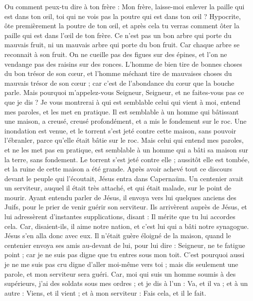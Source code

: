 \begin{multicols}{2}
Ou comment peux-tu dire à ton frère : Mon frère, laisse-moi enlever la paille qui est dans ton œil, toi qui ne vois pas la poutre qui est dans ton œil ? Hypocrite, ôte premièrement la poutre de ton œil, et après cela tu verras comment ôter la paille qui est dans l’œil de ton frère.
Ce n’est pas un bon arbre qui porte du mauvais fruit, ni un mauvais arbre qui porte du bon fruit.
Car chaque arbre se reconnait à son fruit. On ne cueille pas des figues sur des épines, et l’on ne vendange pas des raisins sur des ronces.
L'homme de bien tire de bonnes choses du bon trésor de son cœur, et l'homme méchant tire de mauvaises choses du mauvais trésor de son cœur ; car c'est de l'abondance du cœur que la bouche parle.
Mais pourquoi m'appelez-vous Seigneur, Seigneur, et ne faites-vous pas ce que je dis ?
Je vous montrerai à qui est semblable celui qui vient à moi, entend mes paroles, et les met en pratique.
Il est semblable à un homme qui bâtissant une maison, a creusé, creusé profondément, et a mis le fondement sur le roc. Une inondation est venue, et le torrent s’est jeté contre cette maison, sans pouvoir l’ébranler, parce qu’elle était bâtie sur le roc.
Mais celui qui entend mes paroles, et ne les met pas en pratique, est semblable à un homme qui a bâti sa maison sur la terre, sans fondement. Le torrent s’est jeté contre elle ; aussitôt elle est tombée, et la ruine de cette maison a été grande.
\VerseOne{}Après avoir achevé tout ce discours devant le peuple qui l'écoutait, Jésus entra dans Capernaüm.
Un centenier avait un serviteur, auquel il était très attaché, et qui était malade, sur le point de mourir.
Ayant entendu parler de Jésus, il envoya vers lui quelques anciens des Juifs, pour le prier de venir guérir son serviteur.
Ils arrivèrent auprès de Jésus, et lui adressèrent d’instantes supplications, disant : Il mérite que tu lui accordes cela.
Car, disaient-ils, il aime notre nation, et c’est lui qui a bâti notre synagogue.
Jésus s'en alla donc avec eux. Il n’était guère éloigné de la maison, quand le centenier envoya ses amis au-devant de lui, pour lui dire : Seigneur, ne te fatigue point ; car je ne suis pas digne que tu entres sous mon toit.
C'est pourquoi aussi je ne me suis pas cru digne d'aller moi-même vers toi ; mais dis seulement une parole, et mon serviteur sera guéri.
Car, moi qui suis un homme soumis à des supérieurs, j'ai des soldats sous mes ordres ; et je dis à l'un : Va, et il va ; et à un autre : Viens, et il vient ; et à mon serviteur : Fais cela, et il le fait.

\end{multicols}
